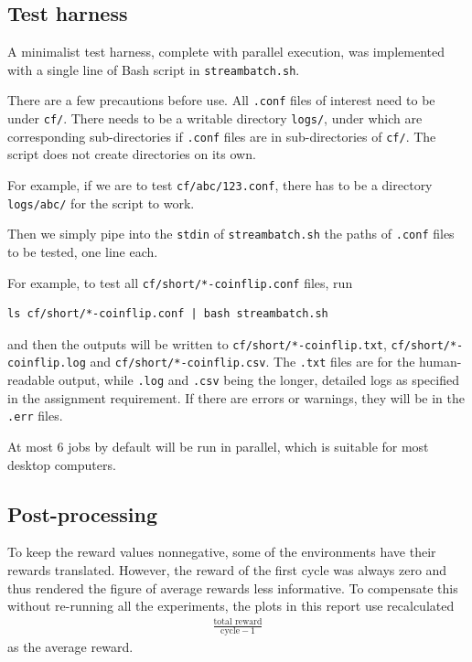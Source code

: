 \documentclass{article}
\let\Oldsubsection\subsection
\renewcommand{\subsection}{\FloatBarrier\Oldsubsection}
\begin{document}
\begin{flushleft}
\subsection{Test harness}

A minimalist test harness, complete with parallel execution, was implemented with 
a single line of Bash script in \verb|streambatch.sh|.
%

There are a few precautions before use.
All \verb|.conf| files of interest need to be under \verb|cf/|.
There needs to be a writable directory \verb|logs/|, under which
are corresponding sub-directories if \verb|.conf| files are in 
sub-directories of \verb|cf/|. The script does not create
directories on its own.

For example, if we are to test \verb|cf/abc/123.conf|, there has to be
a directory \verb|logs/abc/| for the script to work.

Then we simply pipe into the \verb|stdin| of \verb|streambatch.sh| the paths of 
\verb|.conf| files to be tested, one line each.

For example, to test all \verb|cf/short/*-coinflip.conf| files, 
run 
\begin{verbatim}
ls cf/short/*-coinflip.conf | bash streambatch.sh
\end{verbatim}
and then the outputs will be written to \verb|cf/short/*-coinflip.txt|,
\verb|cf/short/*-coinflip.log| and
\verb|cf/short/*-coinflip.csv|.
The \verb|.txt| files are for the human-readable output, while \verb|.log| and
\verb|.csv| being the longer, detailed logs as specified in the assignment
requirement.
If there are errors or warnings, they will be in the \verb|.err| files.

At most 6 jobs by default will be run in parallel, which is suitable for most desktop
computers.

\subsection{Post-processing}
To keep the reward values nonnegative, some of the environments have their rewards
translated.
However, the reward of the first cycle was always zero and
thus rendered the figure of average rewards less informative.
To compensate this without re-running all the experiments,
the plots in this report use recalculated
\begin{align*}
\frac{\text{total reward}}{\text{cycle} - 1}
\end{align*}
as the average reward.


\end{flushleft}
\end{document}
